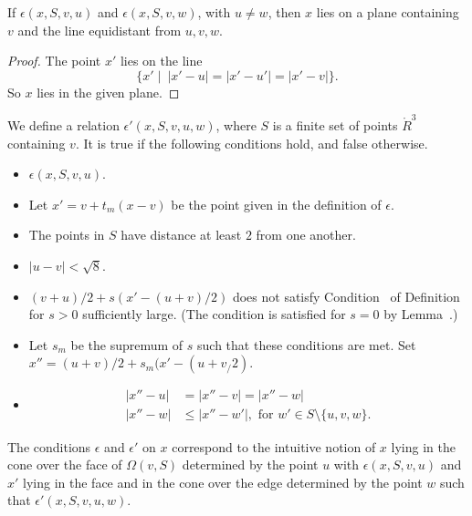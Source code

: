 \begin{lemma}
If $\epsilon(x,S,v,u)$ and $\epsilon(x,S,v,w)$,
with $u\ne w$, then
   $x$ lies on a plane containing $v$ and the line equidistant
from $u,v,w$.  
\end{lemma}

\begin{proof}  The point $x'$ lies on the line
   $$\{x' \mid \ |x'-u|=|x'-u'|=|x'-v|\}.$$
So $x$ lies in the given plane.
\end{proof}


\newpage



\begin{definition}[$\epsilon'$]
We define a relation $\epsilon'(x,S,v,u,w)$, where $S$ is
a finite set of points  $\ring{R}^3$
containing $v$.  It is true if
the following conditions hold, and false otherwise.
\begin{itemize}
  \item $\epsilon(x,S,v,u)$.
  \item Let $x' = v + t_m(x-v)$ be the point given in the
   definition of $\epsilon$.
  \item The points in $S$ have distance at least $2$ from
one another.
  \item  $|u-v|<\sqrt8$.
  \item  $(v+u)/2 + s (x'- (u+v)/2)$ 
  does not satisfy Condition~
of Definition~
for $s>0$ sufficiently large.   (The condition is satisfied for
$s=0$ by Lemma~.)  
  \item Let $s_m$ be the supremum of $s$ such that these
conditions are met.  Set $x''=(u+v)/2+s_m(x'-(u+v_/2)$.
  \item $$
  \begin{array}{lll}
   |x''-u| &= |x''-v| = |x''-w|\\
   |x''-w| &\le |x''-w'|,\text{ for } w'\in S\setminus\{u,v,w\}.
   \end{array}
  $$
\end{itemize}
\end{definition}
 

The conditions $\epsilon$ and $\epsilon'$ on $x$ 
correspond to the intuitive notion of $x$ lying
in the cone over the face of $\Omega(v,S)$ determined by the point $u$
with  
$\epsilon(x,S,v,u)$ and $x'$ lying in
the face and in the cone over the edge determined by the point $w$ such
that 
$\epsilon'(x,S,v,u,w)$.

